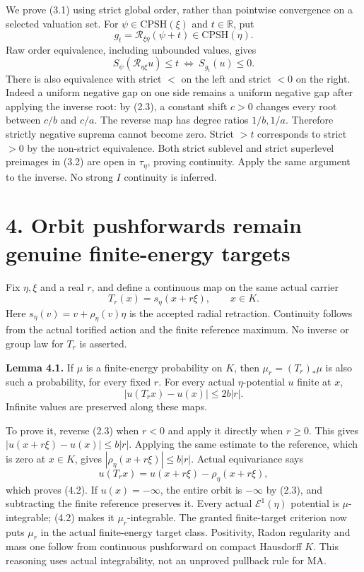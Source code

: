 \documentclass[
  10pt,
]{article}
\begin{document}
We prove (3.1) using strict global order, rather than pointwise
convergence on a selected valuation set. For
\(\psi\in\mathrm{CPSH}(\xi)\) and \(t\in\mathbb R\), put \[
g_t=\mathcal R_{\xi\eta}(\psi+t)\in\mathrm{CPSH}(\eta).
\] Raw order equivalence, including unbounded values, gives \[
S_\psi(\mathcal R_{\eta\xi}u)\le t\ \Longleftrightarrow\ S_{g_t}(u)\le0.   \tag{3.2}
\] There is also equivalence with strict \(<\) on the left and strict
\(<0\) on the right. Indeed a uniform negative gap on one side remains a
uniform negative gap after applying the inverse root: by (2.3), a
constant shift \(c>0\) changes every root between \(c/b\) and \(c/a\).
The reverse map has degree ratios \(1/b,1/a\). Therefore strictly
negative suprema cannot become zero. Strict \(>t\) corresponds to strict
\(>0\) by the non-strict equivalence. Both strict sublevel and strict
superlevel preimages in (3.2) are open in \(\tau_\eta\), proving
continuity. Apply the same argument to the inverse. No strong \(I\)
continuity is inferred.

\section{4. Orbit pushforwards remain genuine finite-energy
targets}\label{orbit-pushforwards-remain-genuine-finite-energy-targets}

Fix \(\eta,\xi\) and a real \(r\), and define a continuous map on the
same actual carrier \[
T_r(x)=s_\eta(x+r\xi),\qquad x\in K.                             \tag{4.1}
\] Here \(s_\eta(v)=v+\rho_\eta(v)\eta\) is the accepted radial
retraction. Continuity follows from the actual torified action and the
finite reference maximum. No inverse or group law for \(T_r\) is
asserted.

\textbf{Lemma 4.1.} If \(\mu\) is a finite-energy probability on \(K\),
then \(\mu_r=(T_r)_*\mu\) is also such a probability, for every fixed
\(r\). For every actual \(\eta\)-potential \(u\) finite at \(x\), \[
|u(T_r x)-u(x)|\le2b|r|.                                      \tag{4.2}
\] Infinite values are preserved along these maps.

To prove it, reverse (2.3) when \(r<0\) and apply it directly when
\(r\ge0\). This gives \(|u(x+r\xi)-u(x)|\le b|r|\). Applying the same
estimate to the reference, which is zero at \(x\in K\), gives
\(|\rho_\eta(x+r\xi)|\le b|r|\). Actual equivariance says \[
u(T_r x)=u(x+r\xi)-\rho_\eta(x+r\xi),
\] which proves (4.2). If \(u(x)=-\infty\), the entire orbit is
\(-\infty\) by (2.3), and subtracting the finite reference preserves it.
Every actual \(\mathcal E^1(\eta)\) potential is \(\mu\)-integrable;
(4.2) makes it \(\mu_r\)-integrable. The granted finite-target criterion
now puts \(\mu_r\) in the actual finite-energy target class. Positivity,
Radon regularity and mass one follow from continuous pushforward on
compact Hausdorff \(K\). This reasoning uses actual integrability, not
an unproved pullback rule for MA.
\end{document}

